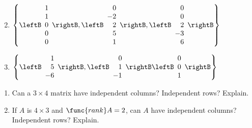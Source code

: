 \begin{multicols}{2}
\begin{ex}
\begin{enumerate}[label={\alph*.}]
\end{enumerate}
\begin{sol}
\begin{enumerate}[label={\alph*.}]
\setcounter{enumi}{1}
\item  
$\left\{
\leftB \begin{array}{r}
1\\
1\\
0\\
0\\
0
\end{array} \rightB, \leftB \begin{array}{r}
0\\
-2\\
2\\
5\\
1
\end{array} \rightB, \leftB \begin{array}{r}
0\\
0\\
2\\
-3\\
6
\end{array} \rightB
\right\}$

\setcounter{enumi}{3}
\item 
$\left\{
\leftB \begin{array}{r}
1\\
5\\
-6
\end{array} \rightB, \leftB \begin{array}{r}
0\\
1\\
-1
\end{array} \rightB
\leftB \begin{array}{r}
0\\
0\\
1
\end{array} \rightB
\right\}$

\end{enumerate}
\end{sol}
\end{ex}

\begin{ex}
\begin{enumerate}[label={\alph*.}]
\item Can a $3 \times 4$ matrix have independent columns? \newline Independent rows? Explain.

\item If $A$ is $4 \times 3$ and $\func{rank} A = 2$, can $A$ have independent columns? Independent rows? Explain.


\end{enumerate}
\end{ex}
\end{multicols}
